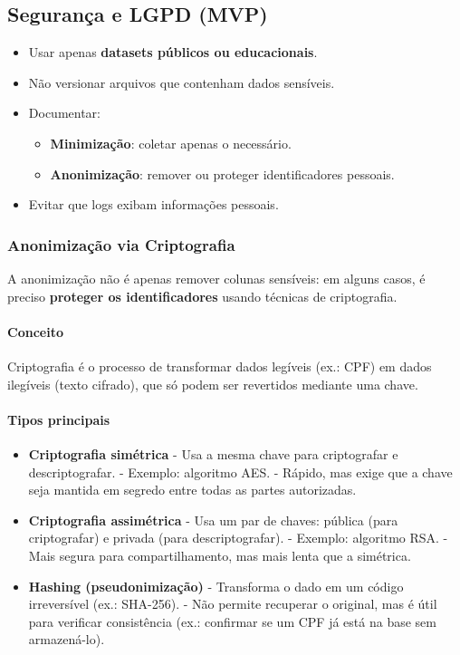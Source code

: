 \documentclass[12pt,a4paper]{article}
\begin{document}
\subsection{Segurança e LGPD (MVP)}

\begin{itemize}
  \item Usar apenas \textbf{datasets públicos ou educacionais}.  
  \item Não versionar arquivos que contenham dados sensíveis.  
  \item Documentar:  
    \begin{itemize}
      \item \textbf{Minimização}: coletar apenas o necessário.  
      \item \textbf{Anonimização}: remover ou proteger identificadores pessoais.  
    \end{itemize}
  \item Evitar que logs exibam informações pessoais.  
\end{itemize}

\subsubsection{Anonimização via Criptografia}

A anonimização não é apenas remover colunas sensíveis: em alguns casos, é preciso \textbf{proteger os identificadores} usando técnicas de criptografia.  

\paragraph{Conceito}  
Criptografia é o processo de transformar dados legíveis (ex.: CPF) em dados ilegíveis (texto cifrado), que só podem ser revertidos mediante uma chave.  

\paragraph{Tipos principais}  
\begin{itemize}
  \item \textbf{Criptografia simétrica}  
  - Usa a mesma chave para criptografar e descriptografar.  
  - Exemplo: algoritmo AES.  
  - Rápido, mas exige que a chave seja mantida em segredo entre todas as partes autorizadas.  

  \item \textbf{Criptografia assimétrica}  
  - Usa um par de chaves: pública (para criptografar) e privada (para descriptografar).  
  - Exemplo: algoritmo RSA.  
  - Mais segura para compartilhamento, mas mais lenta que a simétrica.  

  \item \textbf{Hashing (pseudonimização)}  
  - Transforma o dado em um código irreversível (ex.: SHA-256).  
  - Não permite recuperar o original, mas é útil para verificar consistência (ex.: confirmar se um CPF já está na base sem armazená-lo).  
\end{itemize}
\end{document}
